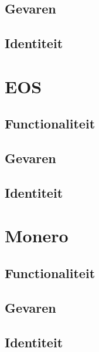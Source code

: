 \subsection{Gevaren}

\subsection{Identiteit}


\newpage

\section{EOS}
\subsection{Functionaliteit}

\subsection{Gevaren}

\subsection{Identiteit}


\section{Monero}
\subsection{Functionaliteit}

\subsection{Gevaren}

\subsection{Identiteit}
